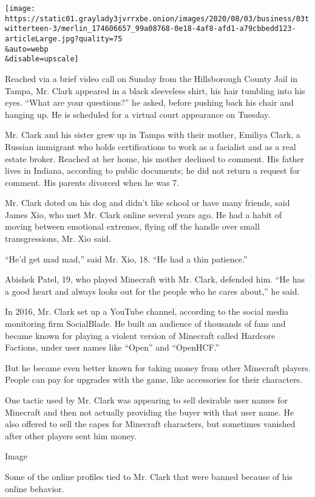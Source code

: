 \texttt{[image: https://static01.graylady3jvrrxbe.onion/images/2020/08/03/business/03twitterteen-3/merlin\_174606657\_99a08768-0e18-4af8-afd1-a79cbbedd123-articleLarge.jpg?quality=75\\\&auto=webp\\\&disable=upscale]}

Reached via a brief video call on Sunday from the Hillsborough County
Jail in Tampa, Mr. Clark appeared in a black sleeveless shirt, his hair
tumbling into his eyes. ``What are your questions?'' he asked, before
pushing back his chair and hanging up. He is scheduled for a virtual
court appearance on Tuesday.

Mr. Clark and his sister grew up in Tampa with their mother, Emiliya
Clark, a Russian immigrant who holds certifications to work as a
facialist and as a real estate broker. Reached at her home, his mother
declined to comment. His father lives in Indiana, according to public
documents; he did not return a request for comment. His parents divorced
when he was 7.

Mr. Clark doted on his dog and didn't like school or have many friends,
said James Xio, who met Mr. Clark online several years ago. He had a
habit of moving between emotional extremes, flying off the handle over
small transgressions, Mr. Xio said.

``He'd get mad mad,'' said Mr. Xio, 18. ``He had a thin patience.''

Abishek Patel, 19, who played Minecraft with Mr. Clark, defended him.
``He has a good heart and always looks out for the people who he cares
about,'' he said.

In 2016, Mr. Clark set up a YouTube channel, according to the social
media monitoring firm SocialBlade. He built an audience of thousands of
fans and became known for playing a violent version of Minecraft called
Hardcore Factions, under user names like ``Open'' and ``OpenHCF.''

But he became even better known for taking money from other Minecraft
players. People can pay for upgrades with the game, like accessories for
their characters.

One tactic used by Mr. Clark was appearing to sell desirable user names
for Minecraft and then not actually providing the buyer with that user
name. He also offered to sell the capes for Minecraft characters, but
sometimes vanished after other players sent him money.

Image

Some of the online profiles tied to Mr. Clark that were banned because
of his online behavior.


